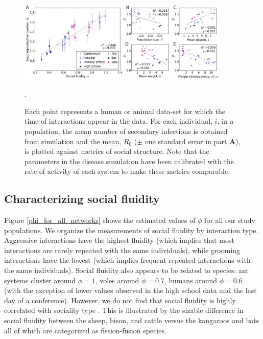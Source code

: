 \documentclass[twocolumn,8pt]{article}
\begin{document}
\begin{figure}[t]
	\centering
	\includegraphics[width=0.9\textwidth]{Figures/R0_for_all_networks.png}\qquad
  	\caption{Each point represents a human or animal data-set for which the time of interactions appear in the data. For each individual, $i$, in a population, the mean number of secondary infections is obtained from simulation and the mean, $R_{0}$ ($\pm$ one standard error in part \textbf{A}), is plotted against metrics of social structure. Note that the parameters in the disease simulation have been calibrated with the rate of activity of each system to make these metrics comparable.}
.\label{disease_simulation_fig}
\end{figure}

\subsection*{Characterizing social fluidity}
Figure \ref{phi_for_all_networks} shows the estimated values of $\phi$ for all our study populations. We organize the measurements of social fluidity by interaction type. Aggressive interactions have the highest fluidity (which implies that most interactions are rarely repeated with the same individuals), while grooming interactions have the lowest (which implies frequent repeated interactions with the same individuals). Social fluidity also appears to be related to species: ant systems cluster around $\phi=1$, voles around $\phi=0.7$, humans around $\phi=0.6$ (with the exception of lower values observed in the high school data and the last day of a conference). However, we do not find that social fluidity is highly correlated with sociality type \cite{pratha_jae}. This is illustrated by the sizable difference in social fluidity between the sheep, bison, and cattle versus the kangaroos and bats all of which are categorized as fission-fusion species.
\end{document}
